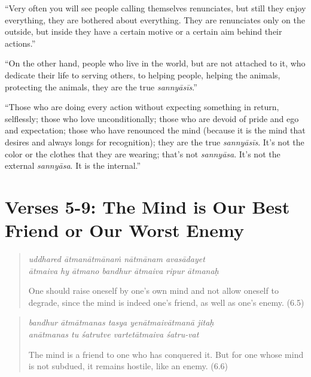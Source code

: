 \documentclass[12pt, twoside, openright]{memoir}
\begin{document}
\enquote{Very often you will see people calling themselves renunciates, but still they enjoy everything, they are bothered about everything. They are renunciates only on the outside, but inside they have a certain motive or a certain aim behind their actions.}

\enquote{On the other hand, people who live in the world, but are not attached to it, who dedicate their life to serving others, to helping people, helping the animals, protecting the animals, they are the true \textit{sannyāsīs}.}

\enquote{Those who are doing every action without expecting something in return, selflessly; those who love unconditionally; those who are devoid of pride and ego and expectation; those who have renounced the mind (because it is the mind that desires and always longs for recognition); they are the true \textit{sannyāsīs}. It's not the color or the clothes that they are wearing; that’s not \textit{sannyāsa}. It’s not the external \textit{sannyāsa}. It is the internal.}

\section{Verses 5-9: The Mind is Our Best Friend or Our Worst Enemy}\label{sec-verses-5-9-the-mind-is-our-best-friend-or-our-worst-enemy}


\par
\begin{verse}
\textit{uddhared ātmanātmānaṁ nātmānam avasādayet} \\
\textit{ātmaiva hy ātmano bandhur ātmaiva ripur ātmanaḥ}

\noindent One should raise oneself by one’s own mind and not allow oneself to degrade, since the mind is indeed one’s friend, as well as one’s enemy. (6.5)
\end{verse}
\par



\par
\begin{verse}
\textit{bandhur ātmātmanas tasya yenātmaivātmanā jitaḥ} \\
\textit{anātmanas tu śatrutve vartetātmaiva śatru-vat}

\noindent The mind is a friend to one who has conquered it. But for one whose mind is not subdued, it remains hostile, like an enemy. (6.6)
\end{verse}
\par
\end{document}
